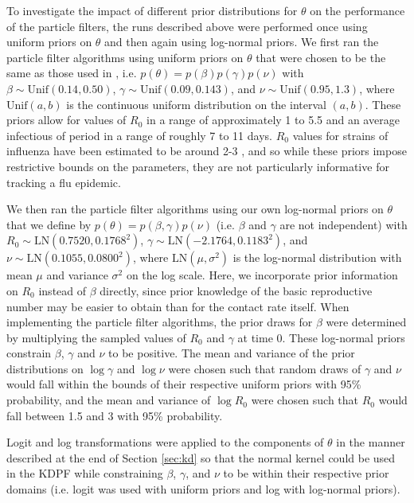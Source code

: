 \documentclass{elsarticle}
\begin{document}
To investigate the impact of different prior distributions for $\theta$ on the performance of the particle filters, the runs described above were performed once using uniform priors on $\theta$ and then again using log-normal priors. We first ran the particle filter algorithms using uniform priors on $\theta$ that were chosen to be the same as those used in \citet{skvortsov2012monitoring}, i.e. $p(\theta) = p(\beta)p(\gamma)p(\nu)$ with $\beta\sim \mbox{Unif}(0.14, 0.50)$, $\gamma\sim\mbox{Unif}(0.09, 0.143)$, and $\nu\sim \mbox{Unif}(0.95, 1.3)$, where $\mbox{Unif}(a, b)$ is the continuous uniform distribution on the interval $(a,b)$. These priors allow for values of $R_0$ in a range of approximately 1 to 5.5 and an average infectious of period in a range of roughly 7 to 11 days. $R_0$ values for strains of influenza have been estimated to be around 2-3 \citep{mills2004influenza, heff2005repratio, zhang2011flu}, and so while these priors impose restrictive bounds on the parameters, they are not particularly informative for tracking a flu epidemic.

We then ran the particle filter algorithms using our own log-normal priors on $\theta$ that we define by $p(\theta) = p(\beta, \gamma)p(\nu)$ (i.e. $\beta$ and $\gamma$ are not independent) with $R_0\sim \mbox{LN}(0.7520, 0.1768^2)$, $\gamma\sim \mbox{LN}(-2.1764, 0.1183^2)$, and $\nu\sim \mbox{LN}(0.1055, 0.0800^2)$, where $\mbox{LN}(\mu, \sigma^2)$ is the log-normal distribution with mean $\mu$ and variance $\sigma^2$ on the log scale. Here, we incorporate prior information on $R_0$ instead of $\beta$ directly, since prior knowledge of the basic reproductive number may be easier to obtain than for the contact rate itself. When implementing the particle filter algorithms, the prior draws for $\beta$ were determined by multiplying the sampled values of $R_0$ and $\gamma$ at time 0. These log-normal priors constrain $\beta$, $\gamma$ and $\nu$ to be positive. The mean and variance of the prior distributions on $\log \gamma$ and $\log \nu$ were chosen such that random draws of $\gamma$ and $\nu$ would fall within the bounds of their respective uniform priors with 95\% probability, and the mean and variance of $\log R_0$ were chosen such that $R_0$ would fall between 1.5 and 3 with 95\% probability.

Logit and log transformations were applied to the components of $\theta$ in the manner described at the end of Section \ref{sec:kd} so that the normal kernel could be used in the KDPF while constraining $\beta$, $\gamma$, and $\nu$ to be within their respective prior domains (i.e. logit was used with uniform priors and log with log-normal priors).
\end{document}
